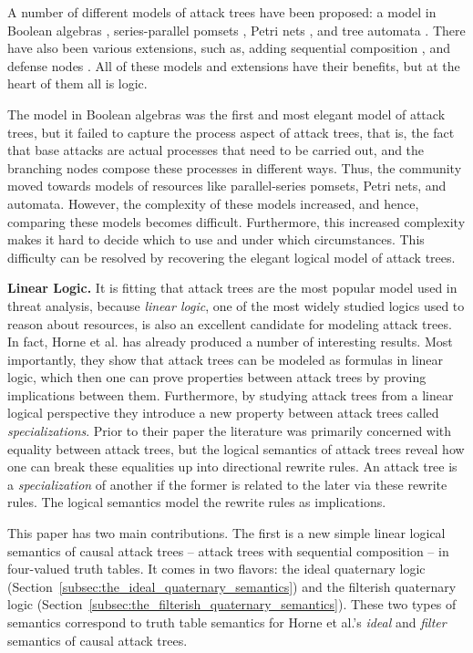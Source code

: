 \documentclass{llncs}
\begin{document}
A number of different models of attack trees have been proposed: a
model in Boolean algebras
\cite{Kordy:2014,Kordy:2012,Pietre-Cambacedes:2010}, series-parallel
pomsets \cite{Mauw:2006}, Petri nets \cite{McDermott:2001}, and tree
automata \cite{Camtepe:2007}.  There have also been various
extensions, such as, adding sequential composition \cite{Jhawar:2015},
and defense nodes \cite{Kordy:2011,Kordy:2012}.  All of these models
and extensions have their benefits, but at the heart of them all is
logic.

The model in Boolean algebras was the first and most elegant model of
attack trees, but it failed to capture the process aspect of attack
trees, that is, the fact that base attacks are actual processes that
need to be carried out, and the branching nodes compose these
processes in different ways.  Thus, the community moved towards models
of resources like parallel-series pomsets, Petri nets, and automata.
However, the complexity of these models increased, and hence,
comparing these models becomes difficult. Furthermore, this increased
complexity makes it hard to decide which to use and under which
circumstances.  This difficulty can be resolved by recovering the
elegant logical model of attack trees.

\textbf{Linear Logic.}  It is fitting that attack trees are the most
popular model used in threat analysis, because \emph{linear logic},
one of the most widely studied logics used to reason about resources,
is also an excellent candidate for modeling attack trees.  In fact,
Horne et al.\cite{horne2017semantics} has already produced a number of
interesting results.  Most importantly, they show that attack trees
can be modeled as formulas in linear logic, which then one can prove
properties between attack trees by proving implications between them.
Furthermore, by studying attack trees from a linear logical
perspective they introduce a new property between attack trees called
\emph{specializations}.  Prior to their paper the literature was
primarily concerned with equality between attack trees, but the
logical semantics of attack trees reveal how one can break these
equalities up into directional rewrite rules.  An attack tree is a
\emph{specialization} of another if the former is related to the later
via these rewrite rules.  The logical semantics model the rewrite
rules as implications.

This paper has two main contributions. The first is a new simple
linear logical semantics of causal attack trees -- attack trees with
sequential composition -- in four-valued truth tables.  It comes in
two flavors: the ideal quaternary logic
(Section~\ref{subsec:the_ideal_quaternary_semantics}) and the
filterish quaternary logic
(Section~\ref{subsec:the_filterish_quaternary_semantics}).  These two
types of semantics correspond to truth table semantics for Horne et
al.'s\cite{horne2017semantics} \emph{ideal} and \emph{filter}
semantics of causal attack trees.
\end{document}

